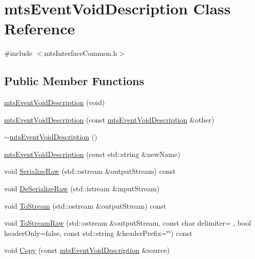 \hypertarget{classmts_event_void_description}{}\section{mts\+Event\+Void\+Description Class Reference}
\label{classmts_event_void_description}


{\ttfamily \#include $<$mts\+Interface\+Common.\+h$>$}

\subsection*{Public Member Functions}
\begin{DoxyCompactItemize}
\item 
\hyperlink{classmts_event_void_description_a88de1af5f03ea4316b965b8ba882a80b}{mts\+Event\+Void\+Description} (void)
\item 
\hyperlink{classmts_event_void_description_a56884037acfd87b2f19874288d9f515f}{mts\+Event\+Void\+Description} (const \hyperlink{classmts_event_void_description}{mts\+Event\+Void\+Description} \&other)
\item 
\hyperlink{classmts_event_void_description_a27bab1931d43f8086e7eab1d562c8835}{$\sim$mts\+Event\+Void\+Description} ()
\item 
\hyperlink{classmts_event_void_description_aa238ca5aec769bc330cc8f177a1f4e4d}{mts\+Event\+Void\+Description} (const std\+::string \&new\+Name)
\item 
void \hyperlink{classmts_event_void_description_a9ca7cb2c40a8e0fbc4eb9c482502562d}{Serialize\+Raw} (std\+::ostream \&output\+Stream) const 
\item 
void \hyperlink{classmts_event_void_description_ae2c3bf5af7d3235d3740ff757cadc795}{De\+Serialize\+Raw} (std\+::istream \&input\+Stream)
\item 
void \hyperlink{classmts_event_void_description_a33b4477bfc8a1a8aca76b7acca62592f}{To\+Stream} (std\+::ostream \&output\+Stream) const 
\item 
void \hyperlink{classmts_event_void_description_aa550762ac229bccc45009137c89a19a3}{To\+Stream\+Raw} (std\+::ostream \&output\+Stream, const char delimiter= \textquotesingle{} \textquotesingle{}, bool header\+Only=false, const std\+::string \&header\+Prefix=\char`\"{}\char`\"{}) const 
\item 
void \hyperlink{classmts_event_void_description_afeec1eee7183472c9f4614f935c312e0}{Copy} (const \hyperlink{classmts_event_void_description}{mts\+Event\+Void\+Description} \&source)

\end{DoxyCompactItemize}
